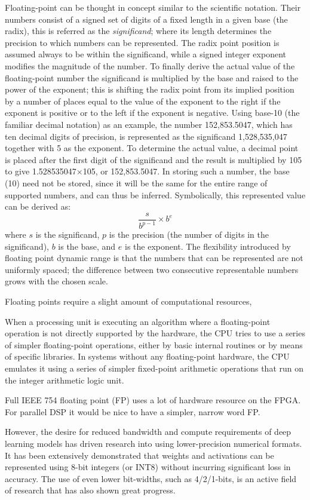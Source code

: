 Floating-point can be thought in concept similar to the scientific notation. Their numbers consist of a signed set of digits of a fixed length in a given base (the radix), this is referred as the \textit{significand}; where its length determines the precision to which numbers can be represented. The radix point position is assumed always to be within the significand, while a signed integer exponent modifies the magnitude of the number.
To finally derive the actual value of the floating-point number the significand is multiplied by the base and raised to the power of the exponent; this is shifting the radix point from its implied position by a number of places equal to the value of the exponent to the right if the exponent is positive or to the left if the exponent is negative.
%
Using base-10 (the familiar decimal notation) as an example, the number 152,853.5047, which has ten decimal digits of precision, is represented as the significand 1,528,535,047 together with 5 as the exponent. To determine the actual value, a decimal point is placed after the first digit of the significand and the result is multiplied by 105 to give 1.528535047×105, or 152,853.5047. In storing such a number, the base (10) need not be stored, since it will be the same for the entire range of supported numbers, and can thus be inferred.
%
Symbolically, this represented value can be derived as:
\begin{equation*}
    \frac{s}{b^{p-1}}  \times b^e
\end{equation*}
where $s$ is the significand, $p$ is the precision (the number of digits in the significand), $b$ is the base, and $e$ is the exponent.
The flexibility introduced by floating point dynamic range is that the numbers that can be represented are not uniformly spaced; the difference between two consecutive representable numbers grows with the chosen scale.

Floating points require a slight amount of computational resources, 

When a processing unit is executing an algorithm where a floating-point operation is not directly supported by the hardware, the CPU tries to use a series of simpler floating-point operations, either by basic internal routines or by means of specific libraries. In systems without any floating-point hardware, the CPU emulates it using a series of simpler fixed-point arithmetic operations that run on the integer arithmetic logic unit.

Full IEEE 754 floating point (FP) uses a lot of hardware resource on the FPGA. For parallel DSP it would be nice to have a simpler, narrow word FP. 


However, the desire for reduced bandwidth and compute requirements of deep learning models has driven research into using lower-precision numerical formats. It has been extensively demonstrated that weights and activations can be represented using 8-bit integers (or INT8) without incurring significant loss in accuracy. The use of even lower bit-widths, such as 4/2/1-bits, is an active field of research that has also shown great progress.


